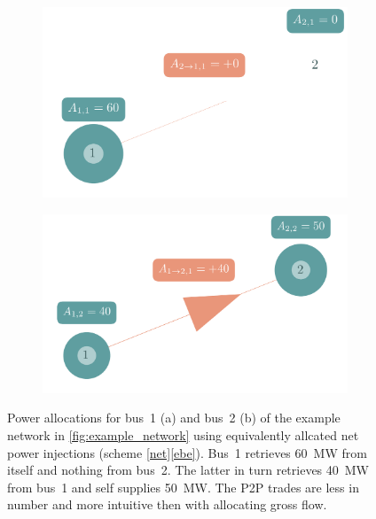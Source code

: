 \documentclass[11pt,twocolumn]{article}
\begin{document}
\begin{figure}[h!]
    \begin{subfigure}[c]{\linewidth}
    \includegraphics[width=\linewidth]{example_allocation_bus1_net_ebe.png}
    \vspace{-40pt}
    \subcaption{}
    \label{fig:example_allocation_bus1_net_ebe}
    \end{subfigure}
    \begin{subfigure}[c]{\linewidth}
    \includegraphics[width=\linewidth]{example_allocation_bus2_net_ebe.png}
    \vspace{-40pt}
    \subcaption{}
    \label{fig:example_allocation_bus2_net_ebe}
    \end{subfigure}
    \caption{Power allocations for bus~1 (a) and bus~2 (b) of the example network in \cref{fig:example_network} using equivalently allcated net power injections (scheme \ref{net}\ref{ebe}). Bus~1 retrieves 60~MW from itself and nothing from bus~2. The latter in turn retrieves 40~MW from bus~1 and self supplies 50~MW. The P2P trades are less in number and more intuitive then with allocating gross flow.}
    \label{fig:example_allocation_net_ebe}
\end{figure}


\clearpage
\printbibliography
\end{document}
